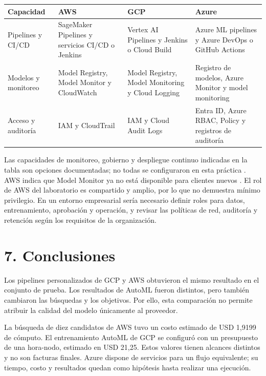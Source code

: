 \begin{fullwidth}\small
\setlength{\tabcolsep}{5pt}\renewcommand{\arraystretch}{1.2}
\begin{tabularx}{\linewidth}{@{}lXXX@{}}
\toprule
\textbf{Capacidad} & \textbf{AWS} & \textbf{GCP} & \textbf{Azure} \\
\midrule
Pipelines y CI/CD & SageMaker Pipelines y servicios CI/CD o Jenkins & Vertex AI Pipelines y Jenkins o Cloud Build & Azure ML pipelines y Azure DevOps o GitHub Actions \\
Modelos y monitoreo & Model Registry, Model Monitor y CloudWatch & Model Registry, Model Monitoring y Cloud Logging & Registro de modelos, Azure Monitor y model monitoring \\
Acceso y auditoría & IAM y CloudTrail & IAM y Cloud Audit Logs & Entra ID, Azure RBAC, Policy y registros de auditoría \\
\bottomrule
\end{tabularx}
\end{fullwidth}

Las capacidades de monitoreo, gobierno y despliegue continuo indicadas en la tabla son opciones documentadas; no todas se configuraron en esta práctica \cite{aws-registro,gcp-seguridad,azure-policy}. AWS indica que Model Monitor ya no está disponible para clientes nuevos \cite{aws-monitor}. El rol de AWS del laboratorio es compartido y amplio, por lo que no demuestra mínimo privilegio. En un entorno empresarial sería necesario definir roles para datos, entrenamiento, aprobación y operación, y revisar las políticas de red, auditoría y retención según los requisitos de la organización.

\section{7. Conclusiones}

Los pipelines personalizados de GCP y AWS obtuvieron el mismo resultado en el conjunto de prueba. Los resultados de AutoML fueron distintos, pero también cambiaron las búsquedas y los objetivos. Por ello, esta comparación no permite atribuir la calidad del modelo únicamente al proveedor.

La búsqueda de diez candidatos de AWS tuvo un costo estimado de USD 1,9199 de cómputo. El entrenamiento AutoML de GCP se configuró con un presupuesto de una hora-nodo, estimado en USD 21,25. Estos valores tienen alcances distintos y no son facturas finales. Azure dispone de servicios para un flujo equivalente; su tiempo, costo y resultados quedan como hipótesis hasta realizar una ejecución.
